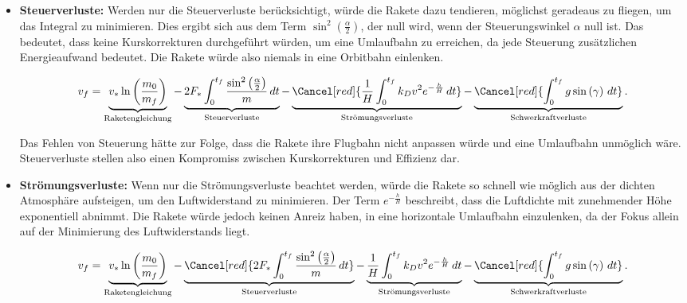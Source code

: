 \begin{itemize}
	\item \textbf{Steuerverluste:} Werden nur die Steuerverluste berücksichtigt, würde die Rakete dazu tendieren, möglichst geradeaus zu fliegen, um das Integral zu minimieren. Dies ergibt sich aus dem Term $\sin^2\left( \frac{\alpha}{2}\right)$, der null wird, wenn der Steuerungswinkel $\alpha$ null ist. Das bedeutet, dass keine Kurskorrekturen durchgeführt würden, um eine Umlaufbahn zu erreichen, da jede Steuerung zusätzlichen Energieaufwand bedeutet. Die Rakete würde also niemals in eine Orbitbahn einlenken.
	
	\begin{equation*}
		v_f = \underbrace{v_* \ln \left(\frac{m_0}{m_f}\right)}_{\text{Raketengleichung}} 
		- \underbrace{2F_* \int_0^{t_f} \frac{\sin^2\left(\frac{\alpha}{2}\right)}{m} \, dt }_{\text{Steuerverluste}}
		- \underbrace{\Cancel[red]{\frac{1}{H} \int_0^{t_f} k_Dv^2 e^{-\frac{h}{H}} \, dt }}_{\text{Strömungsverluste}}
		- \underbrace{\Cancel[red]{\int_0^{t_f} g \sin \left(\gamma\right) \, dt}}_{\text{Schwerkraftverluste}}.
	\end{equation*}
	
	Das Fehlen von Steuerung hätte zur Folge, dass die Rakete ihre Flugbahn nicht anpassen würde und eine Umlaufbahn unmöglich wäre. Steuerverluste stellen also einen Kompromiss zwischen Kurskorrekturen und Effizienz dar.
	
	\item \textbf{Strömungsverluste:} Wenn nur die Strömungsverluste beachtet werden, würde die Rakete so schnell wie möglich aus der dichten Atmosphäre aufsteigen, um den Luftwiderstand zu minimieren. Der Term $e^{-\frac{h}{H}}$ beschreibt, dass die Luftdichte mit zunehmender Höhe exponentiell abnimmt. Die Rakete würde jedoch keinen Anreiz haben, in eine horizontale Umlaufbahn einzulenken, da der Fokus allein auf der Minimierung des Luftwiderstands liegt.
	
	\begin{equation*}
		v_f = \underbrace{v_* \ln \left(\frac{m_0}{m_f}\right)}_{\text{Raketengleichung}} 
		- \underbrace{\Cancel[red]{2F_* \int_0^{t_f} \frac{\sin^2\left(\frac{\alpha}{2}\right)}{m} \, dt }}_{\text{Steuerverluste}}
		- \underbrace{\frac{1}{H} \int_0^{t_f} k_Dv^2 e^{-\frac{h}{H}} \, dt }_{\text{Strömungsverluste}}
		- \underbrace{\Cancel[red]{\int_0^{t_f} g \sin \left(\gamma\right) \, dt}}_{\text{Schwerkraftverluste}}.
	\end{equation*}
	

\end{itemize}
